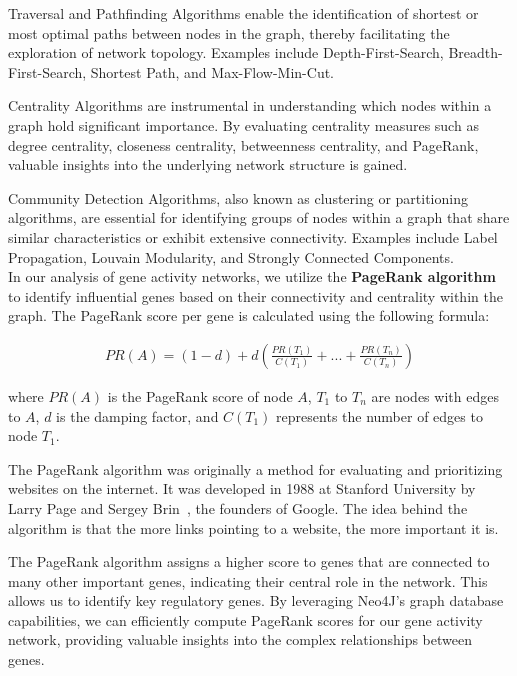 Traversal and Pathfinding Algorithms enable the identification of shortest or
most optimal paths between nodes in the graph, thereby facilitating the exploration of network topology.
Examples include Depth-First-Search, Breadth-First-Search, Shortest Path, and Max-Flow-Min-Cut.

Centrality Algorithms are instrumental in understanding which nodes within a graph hold significant importance.
By evaluating centrality measures such as degree centrality, closeness centrality, betweenness centrality,
and PageRank, valuable insights into the underlying network structure is gained.

Community Detection Algorithms, also known as clustering or partitioning algorithms,
are essential for identifying groups of nodes within a graph that share similar characteristics
or exhibit extensive connectivity.
Examples include Label Propagation, Louvain Modularity, and Strongly Connected Components.
\cite{neo4j_graph_algorithms}\\


In our analysis of gene activity networks,
we utilize the \textbf{PageRank algorithm} to identify influential genes based on their connectivity and
centrality within the graph.
The PageRank score per gene is calculated using the following formula:

\begin{align*}
PR(A)=(1-d)+d(\frac{PR(T_1)}{C(T_1)}+...+\frac{PR(T_n)}{C(T_n)})
\end{align*}

where $PR(A)$ is the PageRank score of node $A$,
$T_1$ to $T_n$ are nodes with edges to $A$,
$d$ is the damping factor,
and $C(T_1)$ represents the number of edges to node $T_1$.

The PageRank algorithm was originally a method for evaluating and prioritizing websites on the internet.
It was developed in 1988 at Stanford University by Larry Page and Sergey Brin~\cite{page1999pagerank},
the founders of Google.
The idea behind the algorithm is that the more links pointing to a website, the more important it is.

The PageRank algorithm assigns a higher score to genes that are connected to many other important genes,
indicating their central role in the network.
This allows us to identify key regulatory genes.
By leveraging Neo4J's graph database capabilities,
we can efficiently compute PageRank scores for our gene activity network,
providing valuable insights into the complex relationships between genes.
